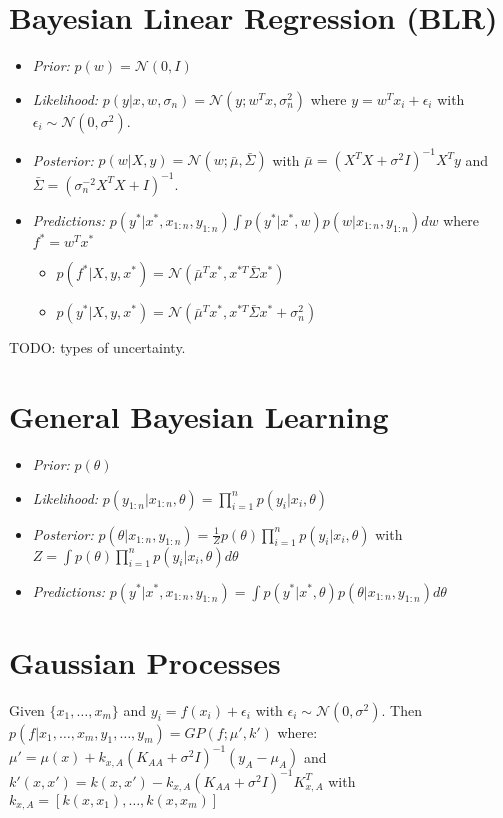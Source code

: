 \documentclass[11pt]{article}
\newcommand{\gauss}{\mathcal{N}}
\begin{document}
	
	\begin{multicols*}{3}
	\section*{Bayesian Linear Regression (BLR)}
	\begin{itemize}
		\item \textit{Prior:} $p(w) = \gauss (0,I)$
\item \textit{Likelihood:} $p(y|x,w,\sigma_n) = \gauss (y;w^Tx,\sigma^2_{n})$ where $y = w^Tx_i + \epsilon_i$ with $\epsilon_i \sim \gauss(0,\sigma^2)$.
\item \textit{Posterior:} $p(w|X,y) = \gauss(w;\bar{\mu},\bar{\Sigma})$ with $\bar{\mu} = (X^TX + \sigma^2 I )^{-1}X^Ty$ and $\bar{\Sigma} = (\sigma_n^{-2}X^T X + I)^{-1}$.
\item \textit{Predictions:} $ p(y^* | x^*, x_{1:n}, y_{1:n}) \int p(y^*|x^*, w) p(w | x_{1:n}, y_{1:n}) dw$ where $f^* = w^T x^*$
\begin{itemize}
	\item $p(f^*| X,y,x^*) = \gauss(\bar{\mu}^T x^*, x^{*T}\bar{\Sigma} x^*)$
	\item $p(y^*| X,y,x^*) = \gauss(\bar{\mu}^T x^*, x^{*T}\bar{\Sigma} x^* + \sigma_n^2)$
\end{itemize}
	\end{itemize}
	
	TODO: types of uncertainty.
	
	\section*{General Bayesian Learning}
	\begin{itemize}
		\item \textit{Prior:} $p(\theta)$
		\item \textit{Likelihood:} $p(y_{1:n}| x_{1:n}, \theta) = \prod_{i=1}^{n} p(y_i | x_i, \theta)$
		\item \textit{Posterior:} $p(\theta | x_{1:n}, y_{1:n}) = \frac{1}{Z} p(\theta) \prod_{i=1}^{n} p(y_i | x_i, \theta)$ with $Z = \int p(\theta) \prod_{i=1}^{n} p(y_i | x_i, \theta) d\theta$
		\item \textit{Predictions:} $p(y^* | x^*, x_{1:n}, y_{1:n}) = \int p(y^*|x^*, \theta)p(\theta | x_{1:n}, y_{1:n}) d\theta$
	\end{itemize}
	
	\section*{Gaussian Processes}
	Given $\{x_1,\ldots,x_m\}$ and $y_i = f(x_i) + \epsilon_i$ with $\epsilon_i \sim \gauss(0,\sigma^2)$. Then $p(f|x_1,\ldots,x_m,y_1,\ldots,y_m) = GP(f;\mu',k')$ where:
	$\mu' = \mu(x) + k_{x,A}(K_{AA} + \sigma^2 I )^{-1}(y_A - \mu_A)$ and $k'(x,x') = k(x,x') - k_{x,A}(K_{AA} + \sigma^2 I)^{-1} K_{x,A}^T$ with $k_{x,A} = [k(x,x_1), \ldots, k(x,x_m)]$

\end{multicols*}
\end{document}
